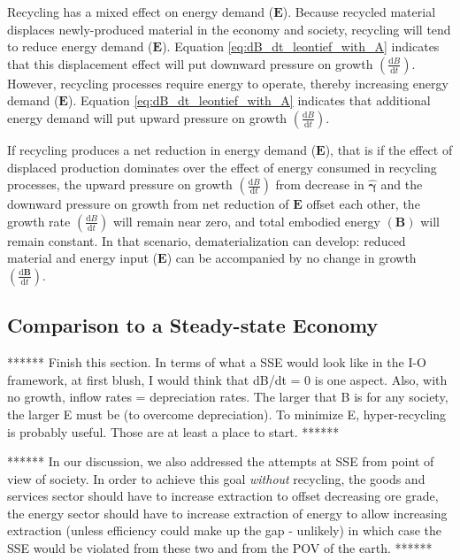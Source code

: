 \documentclass[authoryear,preprint,review,12pt]{elsarticle}
\let\oldhat\hat
\renewcommand{\vec}[1]{\mathbf{#1}}
\renewcommand{\hat}[1]{\oldhat{\mathbf{#1}}}
\begin{document}
Recycling has a mixed effect on energy demand ($\vec{E}$). Because recycled material displaces newly-produced material in the economy and society, recycling will tend to reduce energy demand ($\vec{E}$). Equation \ref{eq:dB_dt_leontief_with_A} indicates that this displacement effect will put downward pressure on growth $\left(\frac{\mathrm{d}B}{\mathrm{d}t}\right)$. However, recycling processes require energy to operate, thereby increasing energy demand ($\vec{E}$). Equation \ref{eq:dB_dt_leontief_with_A} indicates that additional energy demand will put upward pressure on growth $\left(\frac{\mathrm{d}B}{\mathrm{d}t}\right)$. 

If recycling produces a net reduction in energy demand ($\vec{E}$), that is if the effect of displaced production dominates over the effect of energy consumed in recycling processes, the upward pressure on growth $\left(\frac{\mathrm{d}B}{\mathrm{d}t}\right)$ from decrease in $\hat{\vec{\gamma}}$ and the downward pressure on growth from net reduction of $\vec{E}$ offset each other, the growth rate $\left(\frac{\mathrm{d}B}{\mathrm{d}t}\right)$ will remain near zero, and total embodied energy $(\vec{B})$ will remain constant. In that scenario, dematerialization can develop: reduced material and energy input ($\vec{E}$) can be accompanied by no change in growth $\left(\frac{\mathrm{d}\vec{B}}{\mathrm{d}t}\right)$.


\subsection{Comparison to a Steady-state Economy}



****** Finish this section. In terms of what a SSE would look like in the I-O framework, at first blush, I would think that dB/dt = 0 is one aspect.  Also, with no growth, inflow rates = depreciation rates.  The larger that B is for any society, the larger E must be (to overcome depreciation).  To minimize E, hyper-recycling is probably useful.  Those are at least a place to start. ******

****** In our discussion, we also addressed the attempts at SSE from point of view of society. In order to achieve this goal \emph{without} recycling, the goods and services sector should have to increase extraction to offset decreasing ore grade, the energy sector should have to increase extraction of energy to allow increasing extraction (unless efficiency could make up the gap - unlikely) in which case the SSE would be violated from these two and from the POV of the earth.
******
\end{document}
